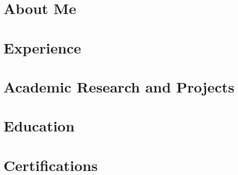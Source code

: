 \documentclass[letterpaper,11pt]{article}
\begin{document}

% 
% 


\section{About Me}
\resumeParagraphStart
    
\resumeParagraphEnd


\section{Experience}
    \resumeSubHeadingListStart  
        
        
        
    \resumeSubHeadingListEnd

\section{Academic Research and Projects}
    \resumeSubHeadingListStart
        
        
    \resumeSubHeadingListEnd

\section{Education}
\resumeSubHeadingListStart
    
    
\resumeSubHeadingListEnd

\section{Certifications}
    \resumeSubHeadingListStart
        
        
        
                
    \resumeSubHeadingListEnd
    
\end{document}
